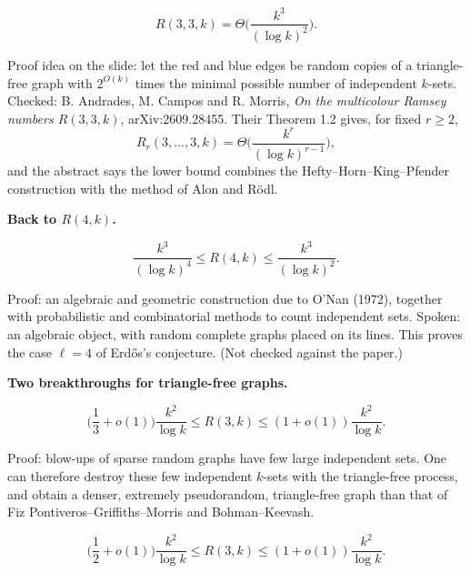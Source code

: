 \begin{theorem}
\label{theorem-acm-r33k}
$$
R(3,3,k)
= \Theta\Big(\frac{k^3}{(\log k)^2}\Big).
$$
\end{theorem}

\noindent
Proof idea on the slide: let the red and
blue edges be random copies of a
triangle-free graph with $2^{O(k)}$ times
the minimal possible number of independent
$k$-sets. Checked: B. Andrades, M. Campos and
R. Morris, \emph{On the multicolour Ramsey
numbers $R(3,3,k)$}, arXiv:2609.28455. Their
Theorem 1.2 gives, for fixed $r \ge 2$,
$$
R_r(3,\ldots,3,k)
= \Theta\Big(\frac{k^r}{(\log k)^{r-1}}\Big),
$$
and the abstract says the lower bound
combines the Hefty--Horn--King--Pfender
construction with the method of Alon and
R\"odl.

\medskip\noindent
{\bf Back to $R(4,k)$.}

\begin{theorem}
\label{theorem-mattheus-verstraete}
$$
\frac{k^3}{(\log k)^4}
\le R(4,k) \le
\frac{k^3}{(\log k)^2}.
$$
\end{theorem}

\noindent
Proof: an algebraic and geometric
construction due to O'Nan (1972), together
with probabilistic and combinatorial methods
to count independent sets. Spoken: an
algebraic object, with random complete
graphs placed on its lines. This proves the
case $\ell = 4$ of Erd\H{o}s's conjecture.
(Not checked against the paper.)

\medskip\noindent
{\bf Two breakthroughs for triangle-free
graphs.}

\begin{theorem}
\label{theorem-cjms}
$$
\Big(\frac{1}{3} + o(1)\Big)
\frac{k^2}{\log k}
\le R(3,k) \le
(1 + o(1))\frac{k^2}{\log k}.
$$
\end{theorem}

\noindent
Proof: blow-ups of sparse random graphs have
few large independent sets. One can
therefore destroy these few independent
$k$-sets with the triangle-free process, and
obtain a denser, extremely pseudorandom,
triangle-free graph than that of
Fiz Pontiveros--Griffiths--Morris and
Bohman--Keevash.

\begin{theorem}
\label{theorem-hhkp}
$$
\Big(\frac{1}{2} + o(1)\Big)
\frac{k^2}{\log k}
\le R(3,k) \le
(1 + o(1))\frac{k^2}{\log k}.
$$
\end{theorem}

